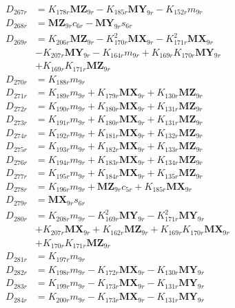 \begin{multicols}{2}
\begin{align}
D_{267r} &= K_{178r}\mathbf{MZ}_{9r} - K_{185r}\mathbf{MY}_{9r} - K_{152r}m_{9r} \nonumber \\
D_{268r} &= \mathbf{MZ}_{9r}c_{6r} - \mathbf{MY}_{9r}s_{6r} \nonumber \\
D_{269r} &= K_{206r}\mathbf{MZ}_{9r} - K_{170r}^2\mathbf{MX}_{9r} - K_{171r}^2\mathbf{MX}_{9r}  \nonumber \\
&- K_{207r}\mathbf{MY}_{9r} - K_{164r}m_{9r} + K_{169r}K_{170r}\mathbf{MY}_{9r}  \nonumber \\
&+ K_{169r}K_{171r}\mathbf{MZ}_{9r} \nonumber \\
D_{270r} &= K_{188r}m_{9r} \nonumber \\
D_{271r} &= K_{189r}m_{9r} + K_{179r}\mathbf{MX}_{9r} + K_{130r}\mathbf{MZ}_{9r} \nonumber \\
D_{272r} &= K_{190r}m_{9r} + K_{180r}\mathbf{MX}_{9r} + K_{131r}\mathbf{MZ}_{9r} \nonumber \\
D_{273r} &= K_{191r}m_{9r} + K_{180r}\mathbf{MX}_{9r} + K_{131r}\mathbf{MZ}_{9r} \nonumber \\
D_{274r} &= K_{192r}m_{9r} + K_{181r}\mathbf{MX}_{9r} + K_{132r}\mathbf{MZ}_{9r} \nonumber \\
D_{275r} &= K_{193r}m_{9r} + K_{182r}\mathbf{MX}_{9r} + K_{133r}\mathbf{MZ}_{9r} \nonumber \\
D_{276r} &= K_{194r}m_{9r} + K_{183r}\mathbf{MX}_{9r} + K_{134r}\mathbf{MZ}_{9r} \nonumber \\
D_{277r} &= K_{195r}m_{9r} + K_{184r}\mathbf{MX}_{9r} + K_{135r}\mathbf{MZ}_{9r} \nonumber \\
D_{278r} &= K_{196r}m_{9r} + \mathbf{MZ}_{9r}c_{5r} + K_{185r}\mathbf{MX}_{9r} \nonumber \\
D_{279r} &= \mathbf{MX}_{9r}s_{6r} \nonumber \\
D_{280r} &= K_{208r}m_{9r} - K_{169r}^2\mathbf{MY}_{9r} - K_{171r}^2\mathbf{MY}_{9r}  \nonumber \\
&+ K_{207r}\mathbf{MX}_{9r} + K_{162r}\mathbf{MZ}_{9r} + K_{169r}K_{170r}\mathbf{MX}_{9r}  \nonumber \\
&+ K_{170r}K_{171r}\mathbf{MZ}_{9r} \nonumber \\
D_{281r} &= K_{197r}m_{9r} \nonumber \\
D_{282r} &= K_{198r}m_{9r} - K_{172r}\mathbf{MX}_{9r} - K_{130r}\mathbf{MY}_{9r} \nonumber \\
D_{283r} &= K_{199r}m_{9r} - K_{173r}\mathbf{MX}_{9r} - K_{131r}\mathbf{MY}_{9r} \nonumber \\
D_{284r} &= K_{200r}m_{9r} - K_{173r}\mathbf{MX}_{9r} - K_{131r}\mathbf{MY}_{9r} \nonumber \\

\end{align}
\end{multicols}
